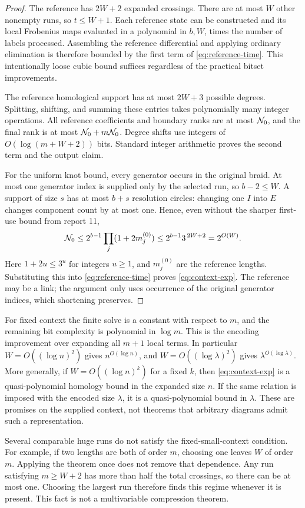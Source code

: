 \begin{proof}
The reference has \(2W+2\) expanded crossings. There are at most \(W\)
other nonempty runs, so \(t\le W+1\).
Each reference state can be constructed and its local Frobenius maps
evaluated in a polynomial in \(b,W\), times the number of labels processed.
Assembling the reference differential and applying ordinary elimination
is therefore bounded by the first term of \eqref{eq:reference-time}.
This intentionally loose cubic bound suffices regardless of the practical
bitset improvements.

The reference homological support has at most \(2W+3\) possible degrees.
Splitting, shifting, and summing these entries takes polynomially many
integer operations. All reference coefficients and boundary ranks are at
most \(\mathcal N_0\), and the final rank is at most
\(\mathcal N_0+m\mathcal N_0\). Degree shifts use integers of \(O(\log(m+W+2))\)
bits. Standard integer arithmetic proves the second term and the output
claim.

For the uniform knot bound, every generator occurs in the original braid.
At most one generator index is supplied only by the selected run, so
\(b-2\le W\). A support of size \(s\) has at most \(b+s\) resolution
circles: changing one \(I\) into \(E\) changes component count by at most
one. Hence, even without the sharper first-use bound from report 11,
\[
\mathcal N_0\le 2^{b-1}\prod_j(1+2m_j^{(0)})
\le 2^{b-1}3^{\,2W+2}=2^{O(W)}.
\]
Here \(1+2u\le3^u\) for integers \(u\ge1\), and \(m_j^{(0)}\)
are the reference lengths. Substituting this into
\eqref{eq:reference-time} proves \eqref{eq:context-exp}.
The reference may be a link; the argument only uses occurrence of the
original generator indices, which shortening preserves.
\end{proof}

For fixed context the finite solve is a constant with respect to \(m\),
and the remaining bit complexity is polynomial in \(\log m\). This is
the encoding improvement over expanding all \(m+1\) local terms.
In particular \(W=O((\log n)^2)\) gives \(n^{O(\log n)}\), and
\(W=O((\log\lambda)^2)\) gives \(\lambda^{O(\log\lambda)}\).
More generally, if \(W=O((\log n)^k)\) for a fixed \(k\), then
\eqref{eq:context-exp} is a quasi-polynomial homology bound in the
expanded size \(n\). If the same relation is imposed with the encoded
size \(\lambda\), it is a quasi-polynomial bound in \(\lambda\).
These are promises on the supplied context, not theorems that arbitrary
diagrams admit such a representation.

Several comparable huge runs do not satisfy the fixed-small-context
condition. For example, if two lengths are both of order \(m\), choosing
one leaves \(W\) of order \(m\). Applying the theorem once does not remove
that dependence. Any run satisfying \(m\ge W+2\) has more than half the
total crossings, so there can be at most one. Choosing the largest run
therefore finds this regime whenever it is present. This fact is not a
multivariable compression theorem.

